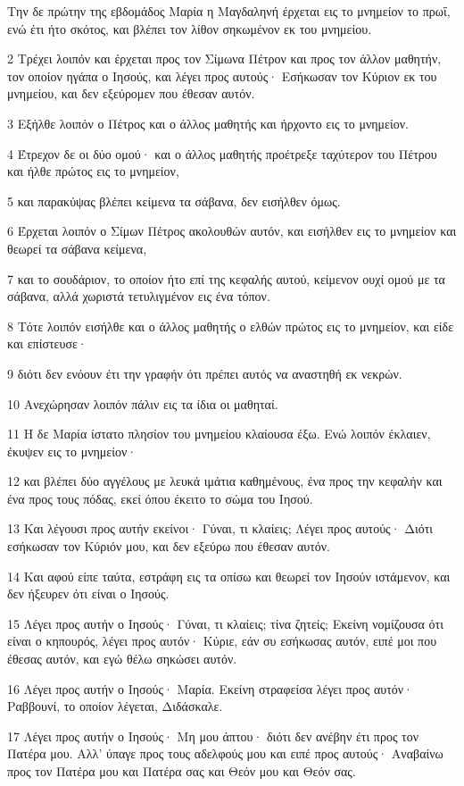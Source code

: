 \par Την δε πρώτην της εβδομάδος Μαρία η Μαγδαληνή έρχεται εις το μνημείον το πρωΐ, ενώ έτι ήτο σκότος, και βλέπει τον λίθον σηκωμένον εκ του μνημείου.
\par 2 Τρέχει λοιπόν και έρχεται προς τον Σίμωνα Πέτρον και προς τον άλλον μαθητήν, τον οποίον ηγάπα ο Ιησούς, και λέγει προς αυτούς· Εσήκωσαν τον Κύριον εκ του μνημείου, και δεν εξεύρομεν που έθεσαν αυτόν.
\par 3 Εξήλθε λοιπόν ο Πέτρος και ο άλλος μαθητής και ήρχοντο εις το μνημείον.
\par 4 Έτρεχον δε οι δύο ομού· και ο άλλος μαθητής προέτρεξε ταχύτερον του Πέτρου και ήλθε πρώτος εις το μνημείον,
\par 5 και παρακύψας βλέπει κείμενα τα σάβανα, δεν εισήλθεν όμως.
\par 6 Έρχεται λοιπόν ο Σίμων Πέτρος ακολουθών αυτόν, και εισήλθεν εις το μνημείον και θεωρεί τα σάβανα κείμενα,
\par 7 και το σουδάριον, το οποίον ήτο επί της κεφαλής αυτού, κείμενον ουχί ομού με τα σάβανα, αλλά χωριστά τετυλιγμένον εις ένα τόπον.
\par 8 Τότε λοιπόν εισήλθε και ο άλλος μαθητής ο ελθών πρώτος εις το μνημείον, και είδε και επίστευσε·
\par 9 διότι δεν ενόουν έτι την γραφήν ότι πρέπει αυτός να αναστηθή εκ νεκρών.
\par 10 Ανεχώρησαν λοιπόν πάλιν εις τα ίδια οι μαθηταί.
\par 11 Η δε Μαρία ίστατο πλησίον του μνημείου κλαίουσα έξω. Ενώ λοιπόν έκλαιεν, έκυψεν εις το μνημείον·
\par 12 και βλέπει δύο αγγέλους με λευκά ιμάτια καθημένους, ένα προς την κεφαλήν και ένα προς τους πόδας, εκεί όπου έκειτο το σώμα του Ιησού.
\par 13 Και λέγουσι προς αυτήν εκείνοι· Γύναι, τι κλαίεις; Λέγει προς αυτούς· Διότι εσήκωσαν τον Κύριόν μου, και δεν εξεύρω που έθεσαν αυτόν.
\par 14 Και αφού είπε ταύτα, εστράφη εις τα οπίσω και θεωρεί τον Ιησούν ιστάμενον, και δεν ήξευρεν ότι είναι ο Ιησούς.
\par 15 Λέγει προς αυτήν ο Ιησούς· Γύναι, τι κλαίεις; τίνα ζητείς; Εκείνη νομίζουσα ότι είναι ο κηπουρός, λέγει προς αυτόν· Κύριε, εάν συ εσήκωσας αυτόν, ειπέ μοι που έθεσας αυτόν, και εγώ θέλω σηκώσει αυτόν.
\par 16 Λέγει προς αυτήν ο Ιησούς· Μαρία. Εκείνη στραφείσα λέγει προς αυτόν· Ραββουνί, το οποίον λέγεται, Διδάσκαλε.
\par 17 Λέγει προς αυτήν ο Ιησούς· Μη μου άπτου· διότι δεν ανέβην έτι προς τον Πατέρα μου. Αλλ' ύπαγε προς τους αδελφούς μου και ειπέ προς αυτούς· Αναβαίνω προς τον Πατέρα μου και Πατέρα σας και Θεόν μου και Θεόν σας.
